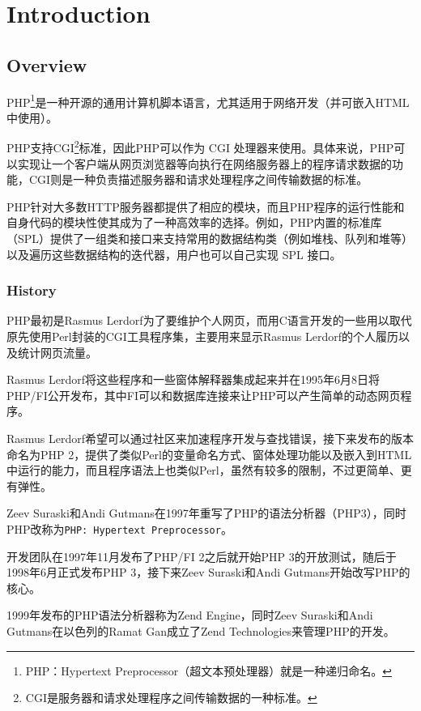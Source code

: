 \part{Introduction}

\chapter{Overview}



PHP\footnote{PHP：Hypertext Preprocessor（超文本预处理器）就是一种递归命名。}是一种开源的通用计算机脚本语言，尤其适用于网络开发（并可嵌入HTML中使用）。

PHP支持CGI\footnote{CGI是服务器和请求处理程序之间传输数据的一种标准。}标准，因此PHP可以作为 CGI 处理器来使用。具体来说，PHP可以实现让一个客户端从网页浏览器等向执行在网络服务器上的程序请求数据的功能，CGI则是一种负责描述服务器和请求处理程序之间传输数据的标准。

PHP针对大多数HTTP服务器都提供了相应的模块，而且PHP程序的运行性能和自身代码的模块性使其成为了一种高效率的选择。例如，PHP内置的标准库（SPL）提供了一组类和接口来支持常用的数据结构类（例如堆栈、队列和堆等）以及遍历这些数据结构的迭代器，用户也可以自己实现 SPL 接口。


\section{History}


PHP最初是Rasmus Lerdorf为了要维护个人网页，而用C语言开发的一些用以取代原先使用Perl封装的CGI工具程序集，主要用来显示Rasmus Lerdorf的个人履历以及统计网页流量。

Rasmus Lerdorf将这些程序和一些窗体解释器集成起来并在1995年6月8日将PHP/FI公开发布，其中FI可以和数据库连接来让PHP可以产生简单的动态网页程序。

Rasmus Lerdorf希望可以通过社区来加速程序开发与查找错误，接下来发布的版本命名为PHP 2，提供了类似Perl的变量命名方式、窗体处理功能以及嵌入到HTML中运行的能力，而且程序语法上也类似Perl，虽然有较多的限制，不过更简单、更有弹性。

Zeev Suraski和Andi Gutmans在1997年重写了PHP的语法分析器（PHP3），同时PHP改称为\texttt{PHP: Hypertext Preprocessor}。

开发团队在1997年11月发布了PHP/FI 2之后就开始PHP 3的开放测试，随后于1998年6月正式发布PHP 3，接下来Zeev Suraski和Andi Gutmans开始改写PHP的核心。

1999年发布的PHP语法分析器称为Zend Engine，同时Zeev Suraski和Andi Gutmans在以色列的Ramat Gan成立了Zend Technologies来管理PHP的开发。

